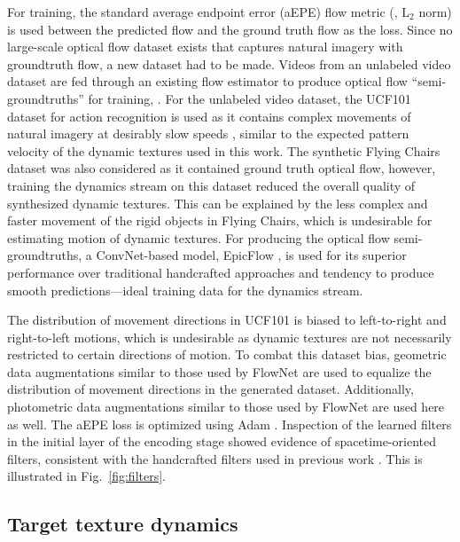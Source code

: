 For training, the standard average
endpoint error (aEPE) flow metric (\ie, $\text{L}_2$
norm) is used between the predicted flow and the ground truth
flow as the loss.
Since no large-scale optical flow dataset exists that captures
natural imagery with groundtruth flow, a new dataset had to be made. Videos
from an unlabeled video dataset are fed through an existing flow
estimator to produce optical
flow ``semi-groundtruths'' for training,
\cf \cite{tran2016}.
For the unlabeled video dataset, the UCF101
dataset for action recognition \cite{soomro2012ucf101} is used as it contains complex movements of natural imagery at desirably slow speeds , similar to the expected pattern velocity of the dynamic textures used in this work. The synthetic Flying Chairs dataset \cite{dosovitskiy2015} was also considered as it contained ground truth optical flow, however, training the dynamics stream on this dataset reduced the overall quality of synthesized dynamic textures. This can be explained by the less complex and faster movement of the rigid objects in Flying Chairs, which is undesirable for estimating motion of dynamic textures.
For producing the optical flow semi-groundtruths, a ConvNet-based model, EpicFlow \cite{revaud2015epicflow}, is used for 
its superior performance over traditional handcrafted approaches and tendency
to produce smooth predictions---ideal training data for the dynamics stream. 

The distribution of movement directions  in UCF101 is biased to left-to-right and right-to-left motions, which is undesirable as dynamic textures are not necessarily restricted to certain directions of motion. To combat this dataset bias, geometric data augmentations similar to those used by FlowNet \cite{dosovitskiy2015} are used to equalize the distribution of movement directions in the generated dataset. Additionally, photometric data augmentations similar to those used by FlowNet \cite{dosovitskiy2015} are used here as well. The aEPE loss is optimized using Adam \cite{kingma2017}.
Inspection of the learned filters in the initial layer of the encoding stage
showed evidence of spacetime-oriented filters, consistent with
the handcrafted filters used in previous work \cite{derpanis2012spacetime}. This is illustrated in Fig.\ \ref{fig:filters}.



\subsection{Target texture dynamics}

